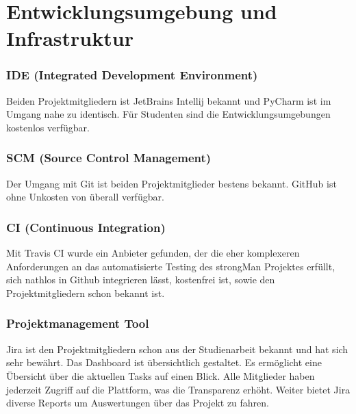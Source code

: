 \section{Entwicklungsumgebung und Infrastruktur}
\subsubsection{IDE (Integrated Development Environment)}
Beiden Projektmitgliedern ist JetBrains Intellij bekannt und \Gls{PyCharm} ist im Umgang nahe zu identisch.
Für Studenten sind die Entwicklungsumgebungen kostenlos verfügbar.
\subsubsection{SCM (Source Control Management)}
Der Umgang mit \Gls{Git} ist beiden Projektmitglieder bestens bekannt.
\Gls{GitHub} ist ohne Unkosten von überall verfügbar.

\subsubsection{CI (Continuous Integration)}
Mit \Gls{Travis CI} wurde ein Anbieter gefunden, der die eher komplexeren Anforderungen an das automatisierte Testing des strongMan Projektes erfüllt, sich nathlos in Github integrieren lässt, kostenfrei ist, sowie den Projektmitgliedern schon bekannt ist.

\subsubsection{Projektmanagement Tool}
\Gls{Jira} ist den Projektmitgliedern schon aus der Studienarbeit bekannt und hat sich sehr bewährt.
Das Dashboard ist übersichtlich gestaltet. Es ermöglicht eine Übersicht über die aktuellen Tasks auf einen Blick.
Alle Mitglieder haben jederzeit Zugriff auf die Plattform, was die Transparenz erhöht.
Weiter bietet Jira diverse Reports um Auswertungen über das Projekt zu fahren.
